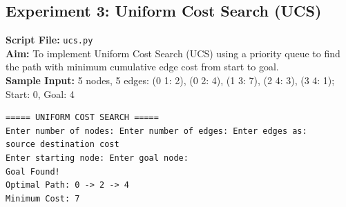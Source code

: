 \subsection*{Experiment 3: Uniform Cost Search (UCS)}
\textbf{Script File:} \texttt{ucs.py} \\[4pt]
\textbf{Aim:} To implement Uniform Cost Search (UCS) using a priority queue to find the path with minimum cumulative edge cost from start to goal. \\[4pt]
\textbf{Sample Input:} 5 nodes, 5 edges: (0 1: 2), (0 2: 4), (1 3: 7), (2 4: 3), (3 4: 1); Start: 0, Goal: 4 \\[6pt]
\begin{tcolorbox}[colback=black!5!white,colframe=black!75!white,title=Terminal Execution Output - Uniform Cost Search (UCS)]
\begin{verbatim}
===== UNIFORM COST SEARCH =====
Enter number of nodes: Enter number of edges: Enter edges as:
source destination cost
Enter starting node: Enter goal node: 
Goal Found!
Optimal Path: 0 -> 2 -> 4
Minimum Cost: 7
\end{verbatim}
\end{tcolorbox}

